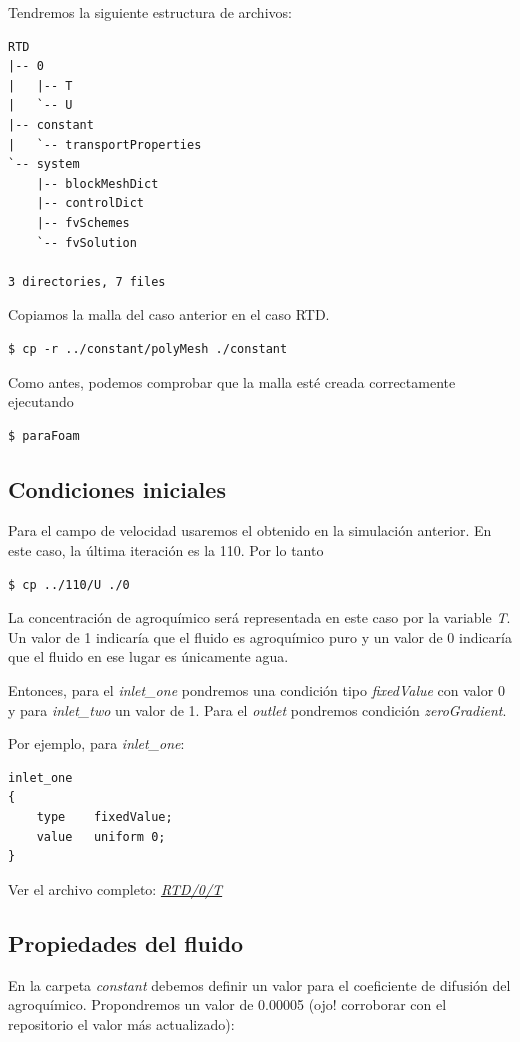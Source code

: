 \documentclass{article}
\begin{document}
Tendremos la siguiente estructura de archivos:
\begin{lstlisting}
RTD
|-- 0
|   |-- T
|   `-- U
|-- constant
|   `-- transportProperties
`-- system
    |-- blockMeshDict
    |-- controlDict
    |-- fvSchemes
    `-- fvSolution

3 directories, 7 files
\end{lstlisting}

Copiamos la malla del caso anterior en el caso RTD.
\begin{lstlisting}
$ cp -r ../constant/polyMesh ./constant
\end{lstlisting}

Como antes, podemos comprobar que la malla esté creada correctamente ejecutando
\begin{lstlisting}
$ paraFoam
\end{lstlisting}

\subsection{Condiciones iniciales}
Para el campo de velocidad usaremos el obtenido en la simulación anterior. En este caso, la última iteración es la 110. Por lo tanto

\begin{lstlisting}
$ cp ../110/U ./0
\end{lstlisting}

La concentración de agroquímico será representada en este caso por la variable \textit{T}. Un valor de 1 indicaría que el fluido es agroquímico puro y un valor de 0 indicaría que el fluido en ese lugar es únicamente agua.

Entonces, para el \textit{inlet\_one} pondremos una condición tipo \textit{fixedValue} con valor 0 y para \textit{inlet\_two} un valor de 1. Para el \textit{outlet} pondremos condición \textit{zeroGradient}.

Por ejemplo, para \textit{inlet\_one}:
\begin{lstlisting}
inlet_one 
{
	type	fixedValue;
	value	uniform 0;
}
\end{lstlisting}

Ver el archivo completo: \textit{\href{https://github.com/guillerolle/casos_cfd/blob/master/01/RTD/0/T}{RTD/0/T}}

%

\subsection{Propiedades del fluido}
En la carpeta \textit{constant} debemos definir un valor para el coeficiente de difusión del agroquímico. Propondremos un valor de 0.00005 (ojo! corroborar con el repositorio el valor más actualizado):
\end{document}
